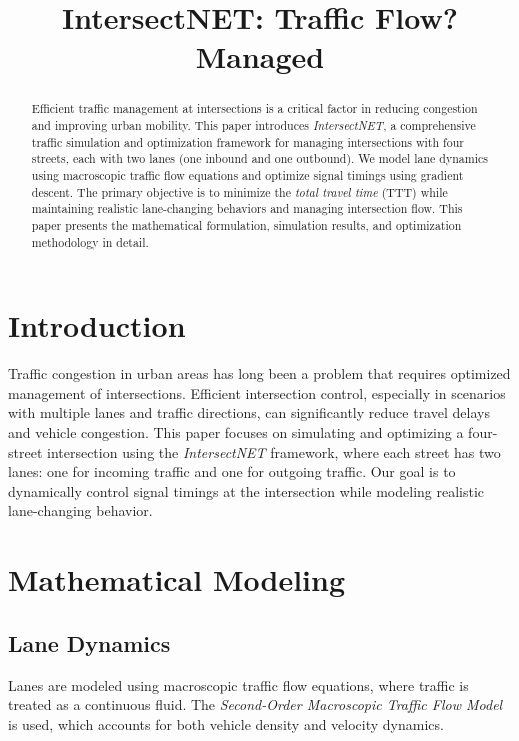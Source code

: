 \documentclass[conference]{IEEEtran}
\title{IntersectNET: Traffic Flow? Managed}
\author{
    \IEEEauthorblockN{Arshia Gharooni}
    \IEEEauthorblockA{
        Email: arshiyagharoony@gmail.com
    }
}
\begin{document}
\maketitle

\begin{abstract}
Efficient traffic management at intersections is a critical factor in reducing congestion and improving urban mobility. This paper introduces \textit{IntersectNET}, a comprehensive traffic simulation and optimization framework for managing intersections with four streets, each with two lanes (one inbound and one outbound). We model lane dynamics using macroscopic traffic flow equations and optimize signal timings using gradient descent. The primary objective is to minimize the \textit{total travel time} (TTT) while maintaining realistic lane-changing behaviors and managing intersection flow. This paper presents the mathematical formulation, simulation results, and optimization methodology in detail.
\end{abstract}

\IEEEpeerreviewmaketitle

\section{Introduction}

Traffic congestion in urban areas has long been a problem that requires optimized management of intersections. Efficient intersection control, especially in scenarios with multiple lanes and traffic directions, can significantly reduce travel delays and vehicle congestion. This paper focuses on simulating and optimizing a four-street intersection using the \textit{IntersectNET} framework, where each street has two lanes: one for incoming traffic and one for outgoing traffic. Our goal is to dynamically control signal timings at the intersection while modeling realistic lane-changing behavior.

\section{Mathematical Modeling}

\subsection{Lane Dynamics}

Lanes are modeled using macroscopic traffic flow equations, where traffic is treated as a continuous fluid. The \textit{Second-Order Macroscopic Traffic Flow Model} is used, which accounts for both vehicle density and velocity dynamics.
\end{document}
